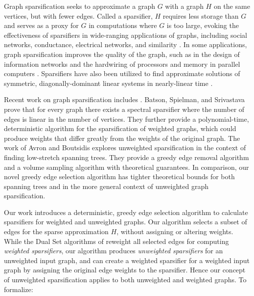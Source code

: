 \documentclass[final,leqno,onefignum,onetabnum]{siamltex1213}
\begin{document}
Graph sparsification seeks to approximate a graph $G$ with a graph $H$ on the same vertices, but with fewer edges.  Called a sparsifier, $H$ requires less storage than $G$ and serves as a proxy for $G$ in computations where $G$ is too large, evoking the effectiveness of sparsifiers in wide-ranging applications of graphs, including social networks, conductance, electrical networks, and similarity \cite{conf/soda/ChierichettiLP10,DBLP:conf/stoc/ChristianoKMST11,conf/kdd/MathioudakisBCGU11,st1}.  In some applications, graph sparsification improves the quality of the graph, such as in the design of information networks and the hardwiring of processors and memory in parallel computers \cite{journals/cacm/BatsonSST13,4495}.  Sparsifiers have also been utilized to find approximate solutions of symmetric, diagonally-dominant linear systems in nearly-linear time \cite{journals/cacm/BatsonSST13,journals/corr/cs-DS-0310036,st1,journals/corr/abs-cs-0607105}.

Recent work on graph sparsification includes \cite{agm,conf/innovations/KapralovP12,ss1,st1,spectsim}.  Batson, Spielman, and Srivastava \cite{ramanujansparse} prove that for every graph there exists a spectral sparsifier where the number of edges is linear in the number of vertices.  They further provide a polynomial-time, deterministic algorithm for the sparsification of weighted graphs, which could produce weights that differ greatly from the weights of the original graph.  The work of Avron and Boutsidis \cite{fasterSub} explores unweighted sparsification in the context of finding low-stretch spanning trees.  They provide a greedy edge removal algorithm and a volume sampling algorithm with theoretical guarantees.  In comparison, our novel greedy edge selection algorithm has tighter theoretical bounds for both spanning trees and in the more general context of unweighted graph sparsification.

Our work introduces a deterministic, greedy edge selection algorithm to calculate sparsifiers for weighted and unweighted graphs.  Our algorithm selects a subset of edges for the sparse approximation $H$, without assigning or altering weights.  While the Dual Set algorithms of \cite{fasterSub, ramanujansparse, nearoptcol} reweight all selected edges for computing \emph{weighted sparsifiers}, our algorithm produces \emph{unweighted sparsifiers} for an unweighted input graph, and can create a weighted sparsifier for a weighted input graph by assigning the original edge weights to the sparsifier.  Hence our concept of unweighted sparsification applies to both unweighted and weighted graphs.  To formalize:
\end{document}
